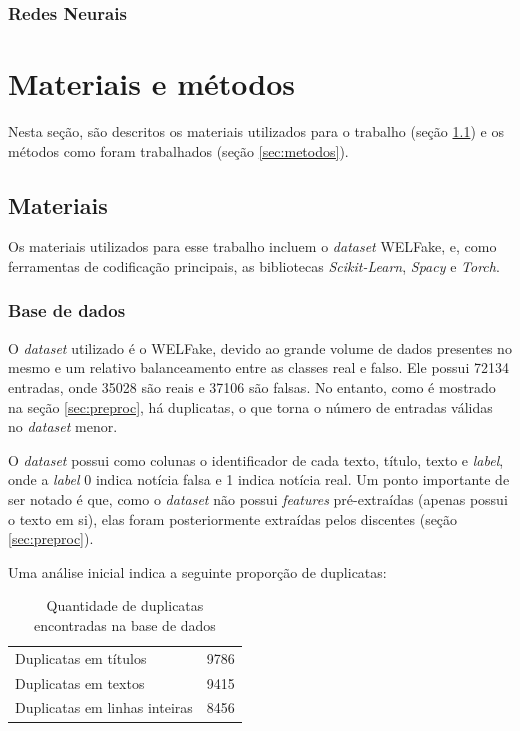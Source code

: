\documentclass[12pt]{article}
\begin{document}
\subsubsection{Redes Neurais}

\section{Materiais e métodos}

	Nesta seção, são descritos os materiais utilizados para o trabalho (seção \ref{sec:materiais}) e os métodos como foram trabalhados (seção \ref{sec:metodos}).
	
\subsection{Materiais} \label{sec:materiais}

Os materiais utilizados para esse trabalho incluem o \textit{dataset} WELFake, e, como ferramentas de codificação principais, as bibliotecas \textit{Scikit-Learn}, \textit{Spacy} e \textit{Torch}.

\subsubsection{Base de dados}

O \textit{dataset} utilizado é o WELFake, devido ao grande volume de dados presentes no mesmo e um relativo balanceamento entre as classes real e falso. Ele possui 72134 entradas, onde 35028 são reais e 37106 são falsas. No entanto, como é mostrado na seção \ref{sec:preproc}, há duplicatas, o que torna o número de entradas válidas no \textit{dataset} menor.

O \textit{dataset} possui como colunas o identificador de cada texto, título, texto e \textit{label}, onde a \textit{label} 0 indica notícia falsa e 1 indica notícia real. Um ponto importante de ser notado é que, como o \textit{dataset} não possui \textit{features} pré-extraídas (apenas possui o texto em si), elas foram posteriormente extraídas pelos discentes (seção \ref{sec:preproc}).

Uma análise inicial indica a seguinte proporção de duplicatas:

\begin{table}[h]
	\centering
	\begin{tabular}{|l|c|}
		\hline
		Duplicatas em títulos & 9786 \\
		Duplicatas em textos & 9415 \\
		Duplicatas em linhas inteiras & 8456 \\
		\hline
	\end{tabular}
	\label{tab:duplicatas}
	\caption{Quantidade de duplicatas encontradas na base de dados}
\end{table}
\end{document}
